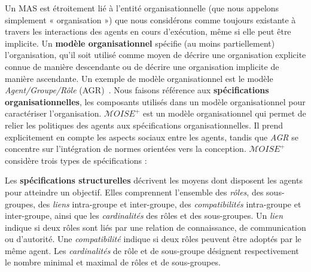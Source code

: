 Un MAS est étroitement lié à l'entité organisationnelle (que nous appelons simplement « organisation ») que nous considérons comme toujours existante à travers les interactions des agents en cours d'exécution, même si elle peut être implicite.
%
%
Un \textbf{modèle organisationnel} spécifie (au moins partiellement) l'organisation, qu'il soit utilisé comme moyen de décrire une organisation explicite connue de manière descendante ou de décrire une organisation implicite de manière ascendante. Un exemple de modèle organisationnel est le modèle \emph{Agent/Groupe/Rôle} (AGR)~\cite{Ferber2004}. Nous faisons référence aux \textbf{spécifications organisationnelles}, les composants utilisés dans un modèle organisationnel pour caractériser l'organisation. $\mathcal{M}OISE^+$ est un modèle organisationnel qui permet de relier les politiques des agents aux spécifications organisationnelles. Il prend explicitement en compte les aspects sociaux entre les agents, tandis que \emph{AGR} se concentre sur l'intégration de normes orientées vers la conception. $\mathcal{M}OISE^+$~\cite{Hubner2007} considère trois types de spécifications :

Les \textbf{spécifications structurelles} décrivent les moyens dont disposent les agents pour atteindre un objectif. Elles comprennent l'ensemble des \emph{rôles}, des sous-groupes, des \emph{liens} intra-groupe et inter-groupe, des \emph{compatibilités} intra-groupe et inter-groupe, ainsi que les \emph{cardinalités} des rôles et des sous-groupes.
Un \emph{lien} indique si deux rôles sont liés par une relation de connaissance, de communication ou d'autorité. Une \emph{compatibilité} indique si deux rôles peuvent être adoptés par le même agent. Les \emph{cardinalités} de rôle et de sous-groupe désignent respectivement le nombre minimal et maximal de rôles et de sous-groupes.

